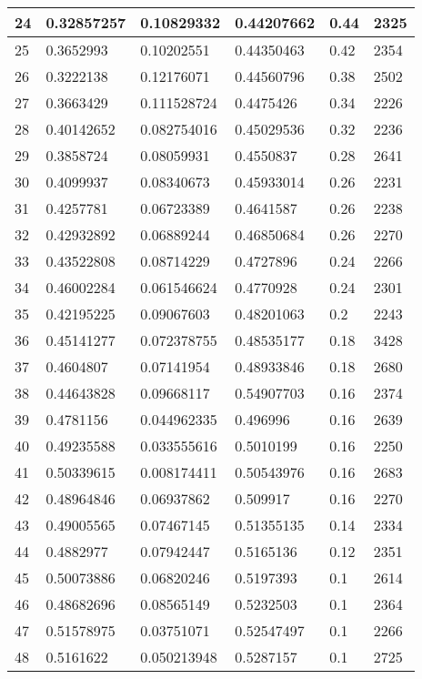 \begin{longtable}{|l|l|l|l|l|l|}
24 & 0.32857257 & 0.10829332 & 0.44207662 & 0.44 & 2325 \\ \hline 
25 & 0.3652993 & 0.10202551 & 0.44350463 & 0.42 & 2354 \\ \hline 
26 & 0.3222138 & 0.12176071 & 0.44560796 & 0.38 & 2502 \\ \hline 
27 & 0.3663429 & 0.111528724 & 0.4475426 & 0.34 & 2226 \\ \hline 
28 & 0.40142652 & 0.082754016 & 0.45029536 & 0.32 & 2236 \\ \hline 
29 & 0.3858724 & 0.08059931 & 0.4550837 & 0.28 & 2641 \\ \hline 
30 & 0.4099937 & 0.08340673 & 0.45933014 & 0.26 & 2231 \\ \hline 
31 & 0.4257781 & 0.06723389 & 0.4641587 & 0.26 & 2238 \\ \hline 
32 & 0.42932892 & 0.06889244 & 0.46850684 & 0.26 & 2270 \\ \hline 
33 & 0.43522808 & 0.08714229 & 0.4727896 & 0.24 & 2266 \\ \hline 
34 & 0.46002284 & 0.061546624 & 0.4770928 & 0.24 & 2301 \\ \hline 
35 & 0.42195225 & 0.09067603 & 0.48201063 & 0.2 & 2243 \\ \hline 
36 & 0.45141277 & 0.072378755 & 0.48535177 & 0.18 & 3428 \\ \hline 
37 & 0.4604807 & 0.07141954 & 0.48933846 & 0.18 & 2680 \\ \hline 
38 & 0.44643828 & 0.09668117 & 0.54907703 & 0.16 & 2374 \\ \hline 
39 & 0.4781156 & 0.044962335 & 0.496996 & 0.16 & 2639 \\ \hline 
40 & 0.49235588 & 0.033555616 & 0.5010199 & 0.16 & 2250 \\ \hline 
41 & 0.50339615 & 0.008174411 & 0.50543976 & 0.16 & 2683 \\ \hline 
42 & 0.48964846 & 0.06937862 & 0.509917 & 0.16 & 2270 \\ \hline 
43 & 0.49005565 & 0.07467145 & 0.51355135 & 0.14 & 2334 \\ \hline 
44 & 0.4882977 & 0.07942447 & 0.5165136 & 0.12 & 2351 \\ \hline 
45 & 0.50073886 & 0.06820246 & 0.5197393 & 0.1 & 2614 \\ \hline 
46 & 0.48682696 & 0.08565149 & 0.5232503 & 0.1 & 2364 \\ \hline 
47 & 0.51578975 & 0.03751071 & 0.52547497 & 0.1 & 2266 \\ \hline 
48 & 0.5161622 & 0.050213948 & 0.5287157 & 0.1 & 2725 \\ \hline 

\end{longtable}

